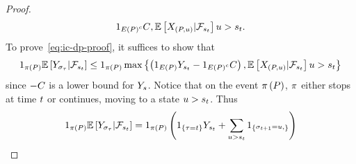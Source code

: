 \begin{proof}
\begin{align*}
{{                1_{
                    E\left(P\right)^c
                }
                C},
            \mathbb{E}\left[
                X_{
                    \left(
                        P, u\right)
                }
                |
                \mathcal{F}_{s_{t}}
            \right]
            u> s_{t}} .
    \end{align*}  
    To prove~\eqref{eq:ic-dp-proof}, it suffices to show that
    \begin{align*}
        1_{
            \pi\left(P\right)
        }
        \mathbb{E}\left[
            Y_{
                \sigma_{\tau}
            }
            | \mathcal{F}_{s_{t}}
        \right]
        \leq 
        1_{
            \pi\left(P\right)
        }
        \max\left\{
            \left(
                1_{
                    E\left(P\right)
                }
                Y_{s_{t}}
                -
                1_{
                    E\left(P\right)^c
                }
                C
            \right),
            \mathbb{E}\left[
                X_{
                    \left(
                        P, u
                    \right)
                }
                |
                \mathcal{F}_{s_{t}}
            \right]
            u
            > s_{t} 
        \right\}
    \end{align*}  
    since $-C$ is a lower bound for $Y_{s}$. Notice that on the event
    $\pi\left(P\right)$, $\pi$ either stops at time 
    $t$ or continues, moving to a state $u>s_{t}$. Thus
    \begin{align*}
        1_{
            \pi\left(P\right)
        }
        \mathbb{E}\left[
            Y_{
                \sigma_{\tau}
            }
            | \mathcal{F}_{s_{t}}
        \right]
        =
        1_{
            \pi\left(P\right)
        }
        \left(
            1_{
                \left\{\tau=t\right\}
            }
            Y_{s_{t}}
            +
            \sum_{
                u>s_{t}
            }
            1_{
                \left\{
                    \substack{
                        \sigma_{t+1}=u,
}\right\}}\right)
\end{align*}
\end{proof}
